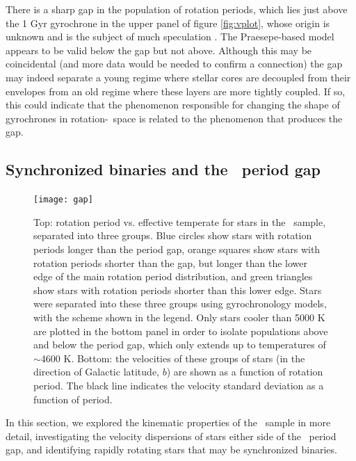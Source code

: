 There is a sharp gap in the population of rotation periods, which lies just
above the 1 Gyr gyrochrone in the upper panel of figure \ref{fig:vplot}, whose
origin is unknown and is the subject of much speculation \citep{mcquillan2014,
davenport2018, reinhold2019}.
The Praesepe-based model appears to be valid below the gap but not above.
Although this may be coincidental (and more data would be needed to confirm a
connection) the gap may indeed separate a young regime where stellar cores are
decoupled from their envelopes from an old regime where these layers are more
tightly coupled.
If so, this could indicate that the phenomenon responsible for changing the
shape of gyrochrones in rotation-\teff\ space is related to the phenomenon that
produces the gap.

\subsection{Synchronized binaries and the \kepler\ period gap}
\label{sec:gap}

\begin{figure}
  \caption{
      Top: rotation period vs. effective temperate for stars in the \mct\
    sample, separated into three groups. Blue circles
      show stars with rotation periods longer than the
    period gap, orange squares show stars with rotation periods shorter than
    the gap, but longer than the lower edge of the main rotation period
    distribution, and green triangles show stars with rotation periods shorter
    than this lower edge.
    Stars were separated into these three groups using \citet{angus2019}
    gyrochronology models, with the scheme shown in the legend.
    Only stars cooler than 5000 K are plotted in
    the bottom panel in order to isolate populations above and below the
    period gap, which only extends up to temperatures of $\sim$4600 K.
    Bottom: the velocities of these groups of stars (in the direction of
    Galactic latitude, $b$) are shown as a function of rotation period.
    The black line indicates the velocity standard deviation as a function of
    period.
}
  \centering
    \texttt{[image: gap]}
\label{fig:gap}
\end{figure}

In this section, we explored the kinematic properties of the \mct\ sample in
more detail, investigating the velocity dispersions of stars either side of the
\kepler\ period gap, and identifying rapidly rotating stars that may be
synchronized binaries.

